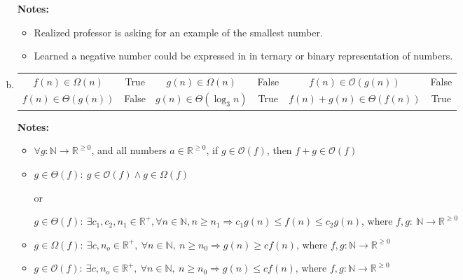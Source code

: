 \documentclass[12pt]{article}
\begin{document}
\begin{enumerate}[a.]
    \bigskip

    \textbf{Notes:}

    \begin{itemize}
        \item Realized professor is asking for an example of the smallest number.
        \item Learned a negative number could be expressed in in ternary or binary
        representation of numbers.
    \end{itemize}

    \item

    \begin{tabular}{|c|c|c|c|c|c|}
        \hline
        $f(n) \in \Omega(n)$ & True & $g(n) \in \Omega(n)$ & False & $f(n) \in \mathcal{O}(g(n))$ & False\\
        $f(n) \in \Theta(g(n))$ & False & $g(n) \in \Theta(\log_3 n)$ & True & $f(n) + g(n) \in \Theta(f(n))$ & True\\
        \hline
    \end{tabular}

    \bigskip

    \textbf{Notes:}

    \begin{itemize}
        \item

        $\forall g:\mathbb{N} \to \mathbb{R}^{\geq 0}$, and all numbers $a \in \mathbb{R}^{\geq 0}$,
        if $g \in \mathcal{O}(f)$, then $f + g \in \mathcal{O}(f)$

        \item
        $g \in \Theta(f):\: g \in \mathcal{O}(f) \land g \in \Omega(f)$

        or

        $g \in \Theta(f):\:\exists c_1,c_2,n_1 \in \mathbb{R}^{+}, \forall n \in \mathbb{N}, n \geq n_1
        \Rightarrow c_1g(n) \leq f(n) \leq c_2g(n)$, where $f,g:\:\mathbb{N} \to \mathbb{R}^{\geq 0}$

        \item
        $g \in \Omega(f):\:\exists c,n_o \in \mathbb{R}^{+},\:\forall n \in
        \mathbb{N},\:n \geq n_0 \Rightarrow g(n) \geq cf(n)$, where $f,g:\mathbb{N} \to \mathbb{R}^{\geq 0}$

        \item

        $g \in \mathcal{O}(f):\:\exists c,n_o \in \mathbb{R}^{+},\:\forall n \in
        \mathbb{N},\:n \geq n_0 \Rightarrow g(n) \leq cf(n)$, where $f,g:\mathbb{N} \to \mathbb{R}^{\geq 0}$


\end{itemize}
\end{enumerate}
\end{document}
